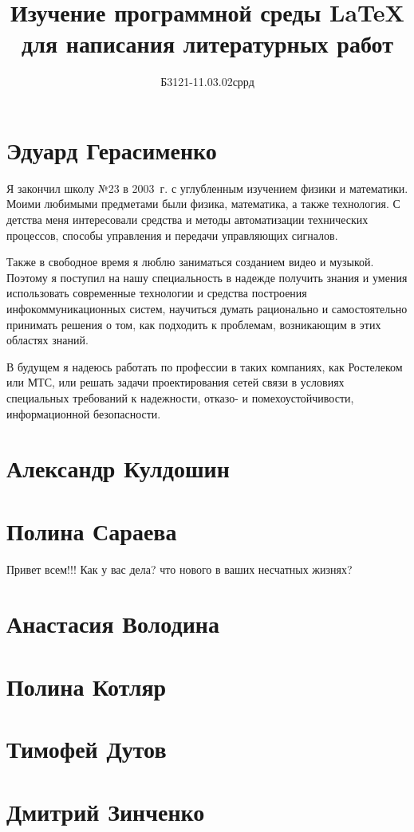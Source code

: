 \documentclass[labwork]{fefudoc}
\author{Б3121-11.03.02сррд}{Герасименко Эдуард}
\title{Изучение программной среды \LaTeX{} для написания литературных работ}
\begin{document}
\frontpage
\tableofcontents

\section{Эдуард Герасименко}
Я закончил школу №23 в 2003~г. с углубленным изучением физики и математики. Моими любимыми предметами были физика, математика, а также технология. С детства меня интересовали средства и методы автоматизации технических процессов, способы управления и передачи управляющих сигналов.

Также в свободное время я люблю заниматься созданием видео и музыкой. Поэтому я поступил на нашу специальность в надежде получить знания и умения использовать современные технологии и средства построения инфокоммуникационных систем, научиться думать рационально и самостоятельно принимать решения о том, как подходить к проблемам, возникающим в этих областях знаний.

В будущем я надеюсь работать по профессии в таких компаниях, как Ростелеком или МТС, или решать задачи проектирования сетей связи в условиях специальных требований к надежности, отказо- и помехоустойчивости, информационной безопасности.

\section{Александр Кулдошин}
\section{Полина Сараева}

Привет всем!!! Как у вас дела? что нового в ваших несчатных жизнях?

\section{Анастасия Володина}
\section{Полина Котляр}
\section{Тимофей Дутов}
\section{Дмитрий Зинченко}
\end{document}
